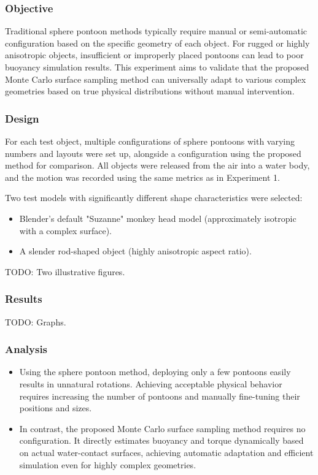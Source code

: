 \subsubsection*{Objective}

Traditional sphere pontoon methods typically require manual or semi-automatic configuration based on the specific geometry of each object. For rugged or highly anisotropic objects, insufficient or improperly placed pontoons can lead to poor buoyancy simulation results.  
This experiment aims to validate that the proposed Monte Carlo surface sampling method can universally adapt to various complex geometries based on true physical distributions without manual intervention.

\subsubsection*{Design}

For each test object, multiple configurations of sphere pontoons with varying numbers and layouts were set up, alongside a configuration using the proposed method for comparison. All objects were released from the air into a water body, and the motion was recorded using the same metrics as in Experiment 1.

Two test models with significantly different shape characteristics were selected:
\begin{itemize}
	\item Blender's default "Suzanne" monkey head model (approximately isotropic with a complex surface).
	\item A slender rod-shaped object (highly anisotropic aspect ratio).
\end{itemize}

{\color{red}TODO: Two illustrative figures.}

\subsubsection*{Results}

{\color{red}TODO: Graphs.}

\subsubsection*{Analysis}

\begin{itemize}
	\item Using the sphere pontoon method, deploying only a few pontoons easily results in unnatural rotations. Achieving acceptable physical behavior requires increasing the number of pontoons and manually fine-tuning their positions and sizes.
	\item In contrast, the proposed Monte Carlo surface sampling method requires no configuration. It directly estimates buoyancy and torque dynamically based on actual water-contact surfaces, achieving automatic adaptation and efficient simulation even for highly complex geometries.
\end{itemize}

